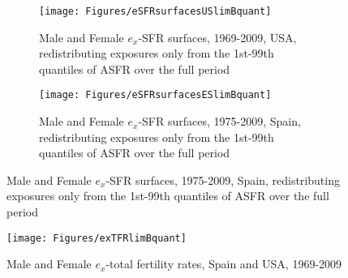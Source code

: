 \begin{figure}
        \centering
        \begin{subfigure}
                \centering
                \caption{Male and Female $e_x$-SFR surfaces, 1969-2009, USA,
                redistributing exposures only from the 1st-99th quantiles of
                ASFR over the full period}
                \texttt{[image: Figures/eSFRsurfacesUSlimBquant]}
                \label{fig:exSFRsurfUSlimBquant}
        \end{subfigure}
        \begin{subfigure}
                \centering
                \caption{Male and Female $e_x$-SFR surfaces, 1975-2009, Spain,
                redistributing exposures only from the 1st-99th quantiles of
                ASFR over the full period}
                \texttt{[image: Figures/eSFRsurfacesESlimBquant]} 
                \label{fig:exSFRsurfESlimBquant}
        \end{subfigure}
\end{figure}

\begin{figure}[ht!]
        \centering  
          \caption{Male and Female $e_x$-total fertility rates, Spain
          and USA, 1969-2009}
           \texttt{[image: Figures/exTFRlimBquant]}
          \label{fig:exTFRlimBquant}
\end{figure}